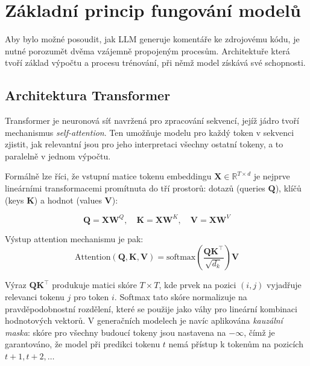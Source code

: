 \section{Základní princip fungování modelů}
\label{sec:llm-functioning}

Aby bylo možné posoudit, jak LLM generuje komentáře ke zdrojovému kódu, je nutné porozumět dvěma vzájemně propojeným procesům.
Architektuře která tvoří základ výpočtu a procesu trénování, při němž model získává své schopnosti.

\subsection{Architektura Transformer}
\label{subsec:transformer-architecture}

Transformer je neuronová síť navržená pro zpracování sekvencí, jejíž jádro tvoří mechanismus \textit{self-attention}\cite{vaswani-attention}.
Ten umožňuje modelu pro každý token v sekvenci zjistit, jak relevantní jsou pro jeho interpretaci všechny ostatní tokeny, a to paralelně v jednom výpočtu.

Formálně lze říci, že vstupní matice tokenu embeddingu $\mathbf{X} \in \mathbb{R}^{T \times d}$ je nejprve lineárními transformacemi promítnuta do tří prostorů: dotazů (queries $\mathbf{Q}$), klíčů (keys $\mathbf{K}$) a hodnot (values $\mathbf{V}$):

\begin{equation}
    \mathbf{Q} = \mathbf{X}\mathbf{W}^Q, \quad
    \mathbf{K} = \mathbf{X}\mathbf{W}^K, \quad
    \mathbf{V} = \mathbf{X}\mathbf{W}^V \label{eq:equations-qkv}
\end{equation}

Výstup attention mechanismu je pak\cite{vaswani-attention}:
\begin{equation}
    \text{Attention}(\mathbf{Q}, \mathbf{K}, \mathbf{V}) = \text{softmax}\!\left(\frac{\mathbf{Q}\mathbf{K}^\top}{\sqrt{d_k}}\right)\mathbf{V} \label{eq:equation-attention}
\end{equation}

Výraz $\mathbf{Q}\mathbf{K}^\top$ produkuje matici skóre $T \times T$, kde prvek na pozici $(i, j)$ vyjadřuje relevanci tokenu $j$ pro token $i$.
Softmax tato skóre normalizuje na pravděpodobnostní rozdělení, které se použije jako váhy pro lineární kombinaci hodnotových vektorů.
V generačních modelech je navíc aplikována \textit{kauzální maska}: skóre pro všechny budoucí tokeny jsou nastavena na $-\infty$, čímž je garantováno, že model při predikci tokenu $t$ nemá přístup k tokenům na pozicích $t+1, t+2, \ldots$

